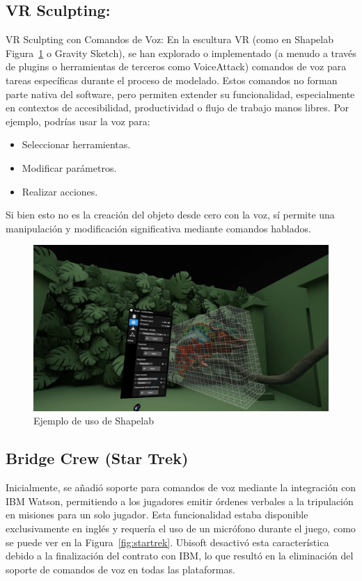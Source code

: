 \documentclass[a4paper, 12pt]{book}
\let\cleardoublepage\clearpage
\begin{document}
\subsection{VR Sculpting:}
VR Sculpting con Comandos de Voz: En la escultura VR (como en Shapelab Figura~\ref{fig:Shapelab} o Gravity Sketch), se han explorado o implementado (a menudo a través de plugins o herramientas de terceros como VoiceAttack) comandos de voz para tareas específicas durante el proceso de modelado. Estos comandos no forman parte nativa del software, pero permiten extender su funcionalidad, especialmente en contextos de accesibilidad, productividad o flujo de trabajo manos libres. Por ejemplo, podrías usar la voz para:
\begin{itemize}
    \item Seleccionar herramientas.
    \item Modificar parámetros.
    \item Realizar acciones.
\end{itemize}
Si bien esto no es la creación del objeto desde cero con la voz, sí permite una manipulación y modificación significativa mediante comandos hablados.
\begin{figure}[H]  %
  \centering
  \includegraphics[width=0.8\linewidth]{img/Shapelab.jpg}  %
  \caption{Ejemplo de uso de Shapelab}  %
  \label{fig:Shapelab}  %
\end{figure}
\cleardoublepage
\subsection{Bridge Crew (Star Trek)}

Inicialmente, se añadió soporte para comandos de voz mediante la integración con IBM Watson, permitiendo a los jugadores emitir órdenes verbales a la tripulación en misiones para un solo jugador. Esta funcionalidad estaba disponible exclusivamente en inglés y requería el uso de un micrófono durante el juego, como se puede ver en la Figura~\ref{fig:startrek}.
Ubisoft desactivó esta característica debido a la finalización del contrato con IBM, lo que resultó en la eliminación del soporte de comandos de voz en todas las plataformas.
\end{document}
